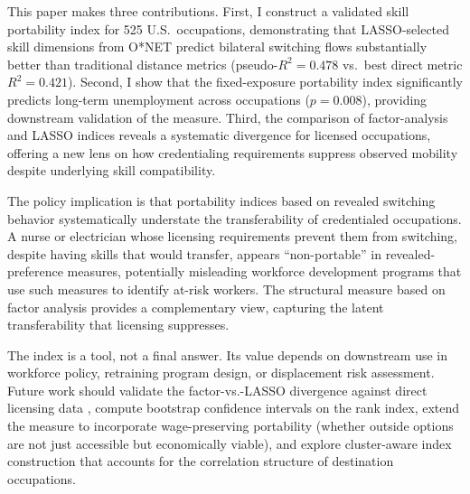 \documentclass[12pt]{article}
\begin{document}
This paper makes three contributions. First, I construct a validated skill portability index for 525 U.S.\ occupations, demonstrating that LASSO-selected skill dimensions from O*NET predict bilateral switching flows substantially better than traditional distance metrics (pseudo-$R^2 = 0.478$ vs.\ best direct metric $R^2 = 0.421$). Second, I show that the fixed-exposure portability index significantly predicts long-term unemployment across occupations ($p = 0.008$), providing downstream validation of the measure. Third, the comparison of factor-analysis and LASSO indices reveals a systematic divergence for licensed occupations, offering a new lens on how credentialing requirements suppress observed mobility despite underlying skill compatibility.

The policy implication is that portability indices based on revealed switching behavior systematically understate the transferability of credentialed occupations. A nurse or electrician whose licensing requirements prevent them from switching, despite having skills that would transfer, appears ``non-portable'' in revealed-preference measures, potentially misleading workforce development programs that use such measures to identify at-risk workers. The structural measure based on factor analysis provides a complementary view, capturing the latent transferability that licensing suppresses.

The index is a tool, not a final answer. Its value depends on downstream use in workforce policy, retraining program design, or displacement risk assessment. Future work should validate the factor-vs.-LASSO divergence against direct licensing data \citep{kleiner2013}, compute bootstrap confidence intervals on the rank index, extend the measure to incorporate wage-preserving portability (whether outside options are not just accessible but economically viable), and explore cluster-aware index construction that accounts for the correlation structure of destination occupations.

\end{document}
